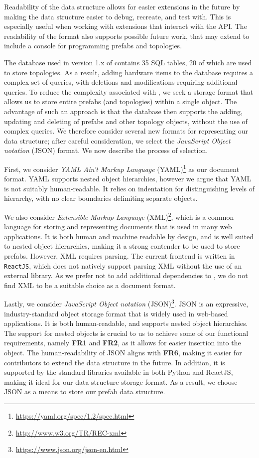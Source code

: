 \documentclass[11pt]{article}
\begin{document}
			Readability of the data structure allows for easier extensions in the future by making the data structure easier to debug, recreate, and test with.
			This is especially useful when working with extensions that interact with the API.
			The readability of the format also supports possible future work, that may extend \opendc{} to include a console for programming prefabs and topologies.

			The database used in version 1.x of \opendc{} contains 35 SQL tables, 20 of which are used to store topologies.
			As a result, adding hardware items to the database requires a complex set of queries, with deletions and modifications requiring additional queries.
			To reduce the complexity associated with \opendc{}, we seek a storage format that allows us to store entire prefabs (and topologies) within a single object.
			The advantage of such an approach is that the database then supports the adding, updating and deleting of prefabs and other topology objects, without the use of complex queries.
			We therefore consider several new formats for representing our data structure; after careful consideration, we select the \textit{JavaScript Object notation} (JSON) format. We now describe the process of selection.

			First, we consider \textit{YAML Ain't Markup Language} (YAML)\footnote{\url{https://yaml.org/spec/1.2/spec.html}} as our document format.
			YAML supports nested object hierarchies, however we argue that YAML is not suitably human-readable.
			It relies on indentation for distinguishing levels of hierarchy, with no clear boundaries delimiting separate objects.

			We also consider \textit{Extensible Markup Language} (XML)\footnote{\url{http://www.w3.org/TR/REC-xml}}, which is a common language for storing and representing documents that is used in many web applications.
			It is both human and machine readable by design, and is well suited to nested object hierarchies, making it a strong contender to be used to store prefabs.
			However, XML requires parsing.
			The current \opendc{} frontend is written in \verb|ReactJS|, which does not natively support parsing XML without the use of an external library.
			As we prefer not to add additional dependencies to \opendc{}, we do not find XML to be a suitable choice as a document format.

			Lastly, we consider \textit{JavaScript Object notation} (JSON)\footnote{\url{https://www.json.org/json-en.html}}.
			JSON is an expressive, industry-standard object storage format that is widely used in web-based applications.
			It is both human-readable, and supports nested object hierarchies.
			The support for nested objects is crucial to us to achieve some of our functional requirements, namely \textbf{FR1} and \textbf{FR2}, as it allows for easier insertion into the object.
			The human-readability of JSON aligns with \textbf{FR6}, making it easier for contributors to extend the data structure in the future.
			In addition, it is supported by the standard libraries available in both Python and ReactJS, making it ideal for our data structure storage format.
			As a result, we choose JSON as a means to store our prefab data structure.
			
\end{document}
